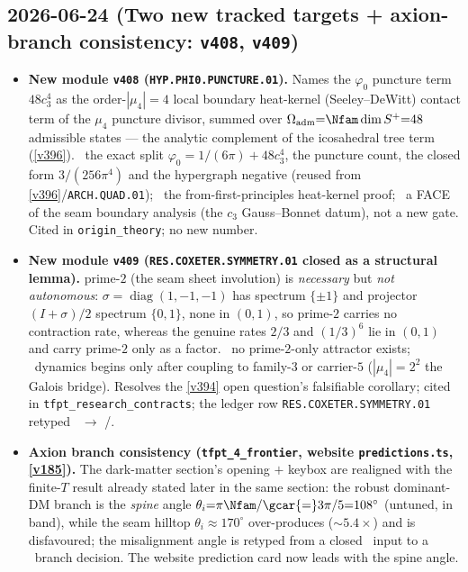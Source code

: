 \subsection*{2026-06-24 (Two new tracked targets + axion-branch consistency: \texttt{v408}, \texttt{v409})}
\begin{itemize}
\item \textbf{New module \texttt{v408} (\texttt{HYP.PHI0.PUNCTURE.01}).} Names the $\varphi_0$ puncture term
$48c_3^4$ as the order-$|\mu_4|{=}4$ local boundary heat-kernel (Seeley--DeWitt) contact term of the $\mu_4$
puncture divisor, summed over $\Omega_{\mathrm{adm}}{=}\Nfam\dim S^+{=}48$ admissible states --- the analytic
complement of the icosahedral tree term (\vref{v396}). \mE\ the exact split $\varphi_0{=}1/(6\pi){+}48c_3^4$,
the puncture count, the closed form $3/(256\pi^4)$ and the hypergraph negative (reused from
\vref{v396}/\texttt{ARCH.QUAD.01}); \mO\ the from-first-principles heat-kernel proof; \mC\ a FACE of the seam
boundary analysis (the $c_3$ Gauss--Bonnet datum), not a new gate. Cited in \texttt{origin\_theory}; no new number.
\item \textbf{New module \texttt{v409} (\texttt{RES.COXETER.SYMMETRY.01} closed as a structural lemma).} prime-$2$
(the seam sheet involution) is \emph{necessary} but \emph{not autonomous}: $\sigma{=}\operatorname{diag}(1,-1,-1)$
has spectrum $\{\pm1\}$ and projector $(I{+}\sigma)/2$ spectrum $\{0,1\}$, none in $(0,1)$, so prime-$2$ carries
no contraction rate, whereas the genuine rates $2/3$ and $(1/3)^6$ lie in $(0,1)$ and carry prime-$2$ only as a
factor. \mE\ no prime-$2$-only attractor exists; \mC\ dynamics begins only after coupling to family-$3$ or
carrier-$5$ ($|\mu_4|{=}2^2$ the Galois bridge). Resolves the \vref{v394} open question's falsifiable corollary;
cited in \texttt{tfpt\_research\_contracts}; the ledger row \texttt{RES.COXETER.SYMMETRY.01} retyped \mO\ $\to$ \mE/\mC.
\item \textbf{Axion branch consistency (\texttt{tfpt\_4\_frontier}, website \texttt{predictions.ts}, \vref{v185}).}
The dark-matter section's opening $+$ keybox are realigned with the finite-$T$ result already stated later in the
same section: the robust dominant-DM branch is the \emph{spine} angle $\theta_i{=}\pi\Nfam/\gcar{=}3\pi/5{=}108^\circ$
(untuned, in band), while the seam hilltop $\theta_i{\approx}170^\circ$ over-produces ($\sim5.4\times$) and is
disfavoured; the misalignment angle is retyped from a closed \mE\ input to a \mC\ branch decision. The website
prediction card now leads with the spine angle.

\end{itemize}
